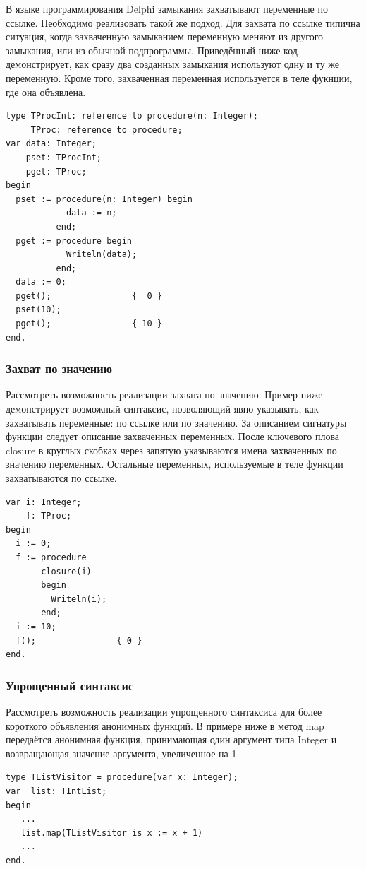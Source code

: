 \documentclass{imcs}
\begin{document}
В языке программирования Delphi замыкания захватывают переменные по ссылке. Необходимо
реализовать такой же подход. Для захвата по ссылке типична ситуация, 
когда захваченную замыканием переменную меняют из другого замыкания,
или из обычной подпрограммы. Приведённый ниже код демонстрирует, как сразу два созданных
замыкания используют одну и ту же переменную. Кроме того, захваченная переменная
используется в теле фукнции, где она объявлена.
\begin{lstlisting}
type TProcInt: reference to procedure(n: Integer);
     TProc: reference to procedure; 
var data: Integer;
    pset: TProcInt;
    pget: TProc;
begin
  pset := procedure(n: Integer) begin 
            data := n;
          end;
  pget := procedure begin
            Writeln(data);
          end;
  data := 0;
  pget();                {  0 }
  pset(10);
  pget();                { 10 }
end.
\end{lstlisting}

\subsubsection{Захват по значению}
Рассмотреть возможность реализации захвата по значению. Пример ниже демонстрирует 
возможный синтаксис, позволяющий явно указывать, как захватывать переменные: по
ссылке или по значению. За описанием сигнатуры функции следует описание
захваченных переменных. После ключевого плова closure в круглых скобках через запятую
указываются имена захваченных по значению переменных. Остальные переменных, используемые в
теле функции захватываются по ссылке. 
\begin{lstlisting}
var i: Integer;
    f: TProc;
begin
  i := 0;
  f := procedure
       closure(i)
       begin
         Writeln(i);
       end;
  i := 10;
  f();                { 0 }
end.
\end{lstlisting}

\subsubsection{Упрощенный синтаксис}
Рассмотреть возможность реализации упрощенного синтаксиса для более короткого объявления
анонимных функций. В примере ниже в метод map передаётся анонимная функция, принимающая
один аргумент типа Integer и возвращающая значение аргумента, увеличенное на 1.
\begin{lstlisting}
type TListVisitor = procedure(var x: Integer);
var  list: TIntList;
begin
   ...
   list.map(TListVisitor is x := x + 1)
   ...
end.
\end{lstlisting}
\end{document}

